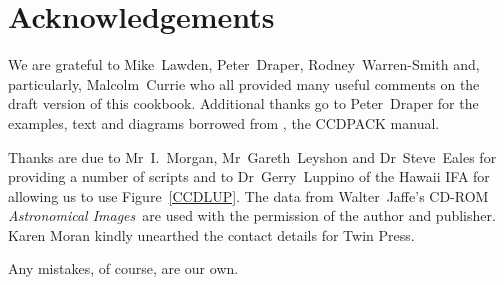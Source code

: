 \documentclass[twoside,11pt]{starlink}
\begin{document}
\newpage
{}
\section*{Acknowledgements}

We are grateful to Mike~Lawden, Peter~Draper, Rodney~Warren-Smith and,
particularly, Malcolm~Currie who all provided many useful comments on the
draft version of this cookbook.  Additional thanks go to Peter~Draper for
the examples, text and diagrams borrowed from , the
CCDPACK manual.

Thanks are due to Mr~I.~Morgan, Mr~Gareth~Leyshon and Dr~Steve~Eales for
providing a number of scripts and to Dr~Gerry~Luppino of the Hawaii IFA
for allowing us to use Figure~\ref{CCDLUP}.  The data from Walter~Jaffe's
CD-ROM \textit{Astronomical Images}\, are used with the permission of the
author and publisher.  Karen Moran kindly unearthed the contact details
for Twin Press.

Any mistakes, of course, are our own.



% 

\end{document}
